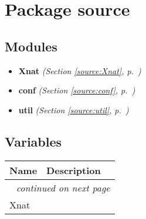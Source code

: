%
%
%


\section{Package source}

    \label{source}


\subsection{Modules}

\begin{itemize}
\setlength{\parskip}{0ex}
\item \textbf{Xnat}
  \textit{(Section \ref{source:Xnat}, p.~\pageref{source:Xnat})}

\item \textbf{conf}
  \textit{(Section \ref{source:conf}, p.~\pageref{source:conf})}

\item \textbf{util}
  \textit{(Section \ref{source:util}, p.~\pageref{source:util})}

\end{itemize}



  \subsection{Variables}

    \vspace{-1cm}
\hspace{\varindent}\begin{longtable}{|p{\varnamewidth}|p{\vardescrwidth}|l}
\cline{1-2}
\cline{1-2} \centering \textbf{Name} & \centering \textbf{Description}& \\
\cline{1-2}
\endhead\cline{1-2}\multicolumn{3}{r}{\small\textit{continued on next page}}\\\endfoot\cline{1-2}
\endlastfoot\raggedright X\-n\-a\-t\- & &\\
\cline{1-2}
\end{longtable}

